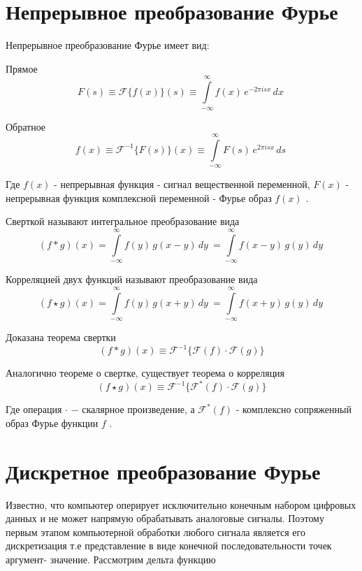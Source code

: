 \documentclass[oneside,final,14pt]{extreport}
\begin{document}
\section{Непрерывное преобразование Фурье}


Непрерывное преобразование Фурье имеет вид: 

Прямое
\begin{equation}
F(s) 
\equiv
\mathcal{F}\{f(x)\}(s)
\equiv
{\int\limits_{-\infty}^{\infty}f(x)\,e^{-2\pi i s x}\,dx~}
\end{equation}

Обратное 
\begin{equation}
f(x) 
\equiv
\mathcal{F}^{-1}\{F(s)\}(x)
\equiv
{\int\limits_{-\infty}^{\infty}F(s)\,e^{2\pi i s x}\,ds~}
\end{equation}

Где $f(x)$ - непрерывная функция - сигнал вещественной переменной,
$F(x)$ - непрерывная функция комплексной переменной - Фурье образ $f(x)$ \cite{Gonzalez}. 

Сверткой называют интегральное преобразование вида
\begin{equation}
(f*g)(x)
=
{\int\limits_{-\infty}^{\infty} f(y)\,g(x-y)\,dy~} 
=
{\int\limits_{-\infty}^{\infty} f(x-y)\,g(y)\,dy~}  
\end{equation}

Корреляцией двух функций называют преобразование вида
\begin{equation}
(f \star g)(x) 
= 
{\int\limits_{-\infty}^{\infty} f(y)\,g(x+y)\,dy~} 
= 
{\int\limits_{-\infty}^{\infty} f(x+y)\,g(y)\,dy~}  
\end{equation}

Доказана теорема свертки 
\begin{equation}
{(f*g)(x)}
\equiv
\mathcal{F}^{-1} \{
\mathcal{F}(f) \cdot \mathcal{F}(g) 
\}
\label{correlation_theorem}
\end{equation}

Аналогично теореме о свертке, существует теорема о корреляция 
\begin{equation}
{(f \star g)(x)} 
\equiv
\mathcal{F}^{-1} \{
\mathcal{F}^*(f) \cdot \mathcal{F}(g) 
\}
\end{equation}

Где операция \hspace{3pt} $\cdot$ \hspace{3pt} $-$ скалярное произведение, а $\mathcal{F}^*(f)$ - комплексно сопряженный образ Фурье функции $f$ .

\section{Дискретное преобразование Фурье}
Известно, что компьютер оперирует исключительно конечным набором цифровых данных и не может напрямую обрабатывать аналоговые сигналы. Поэтому первым этапом компьютерной обработки любого сигнала является его дискретизация т.е представление в виде конечной последовательности точек аргумент- значение.
Рассмотрим дельта функцию 
\end{document}
